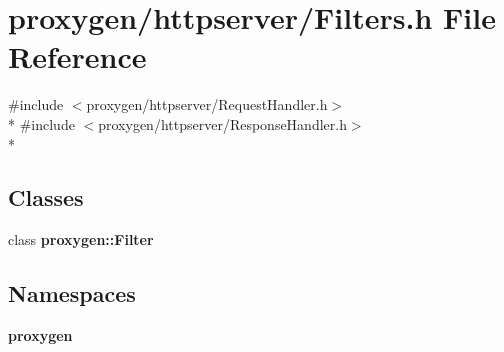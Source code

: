 \section{proxygen/httpserver/\+Filters.h File Reference}
\label{Filters_8h}
{\ttfamily \#include $<$proxygen/httpserver/\+Request\+Handler.\+h$>$}\\*
{\ttfamily \#include $<$proxygen/httpserver/\+Response\+Handler.\+h$>$}\\*
\subsection*{Classes}
\begin{DoxyCompactItemize}
\item 
class {\bf proxygen\+::\+Filter}
\end{DoxyCompactItemize}
\subsection*{Namespaces}
\begin{DoxyCompactItemize}
\item 
 {\bf proxygen}
\end{DoxyCompactItemize}
